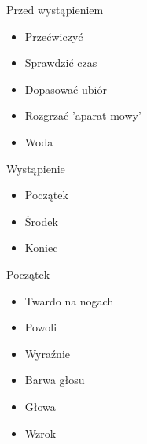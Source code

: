 \documentclass{beamer}
\begin{document}
\begin{frame}{}
	\begin{center}
		\Huge{Przed wystąpieniem}
	\end{center}
\end{frame}

\begin{frame}{}
	\begin{Large}
		\begin{itemize}
			\item Przećwiczyć
			\item Sprawdzić czas
			\item Dopasować ubiór
			\item Rozgrzać 'aparat mowy'
			\item Woda
		\end{itemize}
	\end{Large}
\end{frame}

\begin{frame}{}
	\begin{center}
		\Huge{Wystąpienie}
	\end{center}
\end{frame}

\begin{frame}{}
	\begin{Large}
		\begin{itemize}
			\item Początek
			\item Środek
			\item Koniec
		\end{itemize}
	\end{Large}
\end{frame}

\begin{frame}{}
	\begin{center}
		\Huge{Początek}
	\end{center}
\end{frame}

\begin{frame}{}
	\begin{Large}
		\begin{itemize}
			\item Twardo na nogach
			\item Powoli
			\item Wyraźnie
			\item Barwa głosu
			\item Głowa
			\item Wzrok
		\end{itemize}
	\end{Large}
\end{frame}
\end{document}
